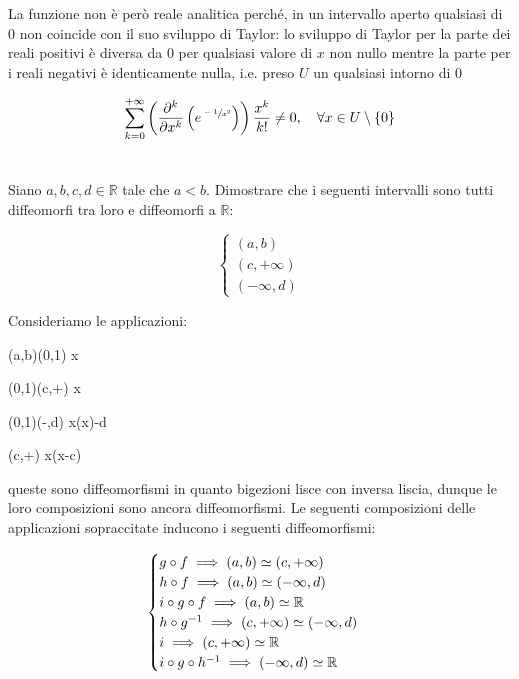 La funzione non è però reale analitica perché, in un intervallo aperto qualsiasi di 0 non coincide con il suo sviluppo di Taylor: lo sviluppo di Taylor per la parte dei reali positivi è diversa da 0 per qualsiasi valore di $ x $ non nullo mentre la parte per i reali negativi è identicamente nulla, i.e. preso $ U $ un qualsiasi intorno di 0

\begin{equation}
	\sum_{k=0}^{+\infty} \left( \pdv[k]{x} \left( e^{\sfrac{-1}{x^{2}}} \right) \right) \dfrac{x^{k}}{k!} \neq 0 \qcomma \forall x \in U \setminus \{0\}
\end{equation}

\tocless\section{}\label{es1-3}

\begin{tcolorbox}
	Siano $ a,b,c,d \in \mathbb{R} $ tale che $ a<b $. Dimostrare che i seguenti intervalli sono tutti diffeomorfi tra loro e diffeomorfi a $ \mathbb{R} $:
	
	\begin{equation}
		\begin{cases}
			(a,b)\\
			(c,+\infty)\\
			(-\infty,d)
		\end{cases}
	\end{equation}
\end{tcolorbox}

Consideriamo le applicazioni:

%
	{(a,b)}{(0,1)}%
	{x}{}

%
	{(0,1)}{(c,+\infty)}%
	{x}{}
	
%
	{(0,1)}{(-\infty,d)}%
	{x}{\ln(x)-d}
	
%
	{(c,+\infty)}{\R}%
	{x}{\ln(x-c)}

queste sono diffeomorfismi in quanto bigezioni lisce con inversa liscia, dunque le loro composizioni sono ancora diffeomorfismi. Le seguenti composizioni delle applicazioni sopraccitate inducono i seguenti diffeomorfismi:

\begin{equation}
	\begin{cases}
		g \circ f \implies (a,b) \simeq (c,+\infty)\\
		h \circ f \implies (a,b) \simeq (-\infty,d)\\
		i \circ g \circ f \implies (a,b) \simeq \mathbb{R}\\
		h \circ g^{-1} \implies (c,+\infty) \simeq (-\infty,d)\\
		i \implies (c,+\infty) \simeq \mathbb{R}\\
		i \circ g \circ h^{-1} \implies (-\infty,d) \simeq \mathbb{R}
	\end{cases}
\end{equation}

